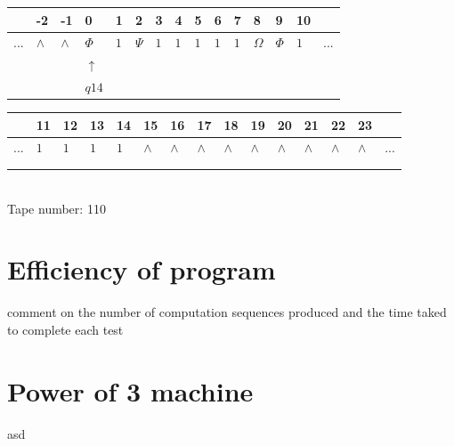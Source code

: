 \documentclass[11pt]{article}
\begin{document}
\begin{table}[H]
\centering
\begin{tabular}{lllllllllllllll}
 & -2 & -1 & 0 & 1 & 2 & 3 & 4 & 5 & 6 & 7 & 8 & 9 & 10 & \\
\hline
$...$ & \multicolumn{1}{|l|}{$\wedge$} & \multicolumn{1}{|l|}{$\wedge$} & \multicolumn{1}{|l|}{$\Phi$} & \multicolumn{1}{|l|}{$1$} & \multicolumn{1}{|l|}{$\Psi$} & \multicolumn{1}{|l|}{$1$} & \multicolumn{1}{|l|}{$1$} & \multicolumn{1}{|l|}{$1$} & \multicolumn{1}{|l|}{$1$} & \multicolumn{1}{|l|}{$1$} & \multicolumn{1}{|l|}{$\Omega$} & \multicolumn{1}{|l|}{$\Phi$} & \multicolumn{1}{|l|}{$1$} & $...$\\
\hline
&  &  & $\uparrow$ &  &  &  &  &  &  &  &  &  &  &  \\
&  &  & $ q14 $ &  &  &  &  &  &  &  &  &  &  &  \\
\end{tabular}
\begin{tabular}{lllllllllllllll}
 & 11 & 12 & 13 & 14 & 15 & 16 & 17 & 18 & 19 & 20 & 21 & 22 & 23 & \\
\hline
$...$ & \multicolumn{1}{|l|}{$1$} & \multicolumn{1}{|l|}{$1$} & \multicolumn{1}{|l|}{$1$} & \multicolumn{1}{|l|}{$1$} & \multicolumn{1}{|l|}{$\wedge$} & \multicolumn{1}{|l|}{$\wedge$} & \multicolumn{1}{|l|}{$\wedge$} & \multicolumn{1}{|l|}{$\wedge$} & \multicolumn{1}{|l|}{$\wedge$} & \multicolumn{1}{|l|}{$\wedge$} & \multicolumn{1}{|l|}{$\wedge$} & \multicolumn{1}{|l|}{$\wedge$} & \multicolumn{1}{|l|}{$\wedge$} & $...$\\
\hline
&  &  &  &  &  &  &  &  &  &  &  &  &  &  \\
&  &  &  &  &  &  &  &  &  &  &  &  &  &  \\
\end{tabular}
\\
Tape number: 110
\noindent\makebox[\linewidth]{\hdashrule{\textwidth}{1pt}{1pt}}\end{table}

\section{Efficiency of program}
comment on the number of computation sequences produced and the time taked to complete each test
\section{Power of 3 machine}
asd
\end{document}
